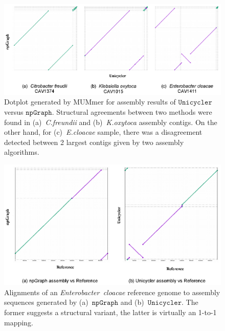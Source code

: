 \documentclass[10pt,letterpaper]{article}
\newcommand{\npgraph}{$\mathtt{npGraph}$}
\newcommand{\unicycler}{$\mathtt{Unicycler}$}
\begin{document}
\begin{figure}[!ht]
 \includegraphics[width=\textwidth]{images/FigS1.eps}
 \caption{Dotplot generated by MUMmer for assembly results of \unicycler{} versus \npgraph{}. Structural agreements between two methods were found in (a)~\emph{C.freundii} and (b)~\emph{K.oxytoca} assembly contigs. On the other hand, for (c)~\emph{E.cloacae} sample, there was a disagreement detected between 2 largest contigs given by two assembly algorithms.}
\end{figure}


\begin{figure}[!ht]
 \includegraphics[width=\textwidth]{images/FigS2.eps}
 \caption{Alignments of an \emph{Enterobacter~cloacae} reference genome to assembly sequences generated by  (a)~\npgraph{} and (b)~\unicycler{}. The former suggests a structural variant, the latter is virtually an 1-to-1 mapping.}
\end{figure}
\end{document}
